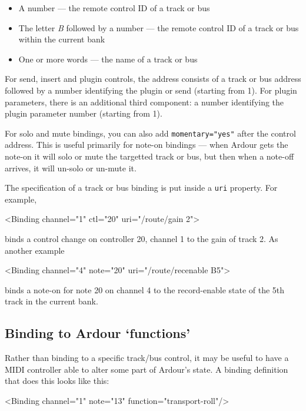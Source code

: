 \documentclass[10pt,a4paper]{book}
\begin{document}
{\begin{itemize}
\item A number --- the remote control ID of a track or bus
\item The letter \emph{B} followed by a number --- the remote control ID of a track or bus within the current bank
\item One or more words --- the name of a track or bus
\end{itemize}

For send, insert and plugin controls, the address consists of a track
or bus address followed by a number identifying the plugin or send
(starting from 1).  For plugin parameters, there is an additional third
component: a number identifying the plugin parameter number (starting
from 1).

For solo and mute bindings, you can also add \texttt{momentary="yes"} after the
control address. This is useful primarily for note-on bindings --- when
Ardour gets the note-on it will solo or mute the targetted track or
bus, but then when a note-off arrives, it will un-solo or un-mute it.

The specification of a track or bus binding is put inside a \texttt{uri} property.  For example,

\begin{listing}
<Binding channel="1" ctl="20" uri="/route/gain 2">
\end{listing}

binds a control change on controller 20, channel 1 to the gain of track 2.  As another example

\begin{listing}
<Binding channel="4" note="20" uri="/route/recenable B5">
\end{listing}

binds a note-on for note 20 on channel 4 to the record-enable state of
the 5th track in the current bank.



\subsection{Binding to Ardour `functions'}

Rather than binding to a specific track/bus control, it may be useful
to have a MIDI controller able to alter some part of Ardour's state. A
binding definition that does this looks like this:

\begin{listing}
<Binding channel="1" note="13" function="transport-roll"/>
\end{listing}

}
\end{document}
